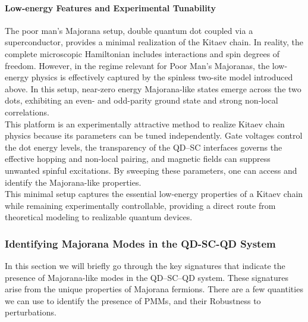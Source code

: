 \paragraph{Low-energy Features and Experimental Tunability}
The poor man's Majorana setup, double quantum dot coupled via a superconductor, provides a minimal realization of the Kitaev chain. In reality, the complete microscopic Hamiltonian includes interactions and spin degrees of freedom. However, in the regime relevant for Poor Man's Majoranas, the low-energy physics is effectively captured by the spinless two-site model introduced above. In this setup, near-zero energy Majorana-like states emerge across the two dots, exhibiting an even- and odd-parity ground state and strong non-local correlations.\\
This platform is an experimentally attractive method to realize Kitaev chain physics because its parameters can be tuned independently. Gate voltages control the dot energy levels, the transparency of the QD–SC interfaces governs the effective hopping and non-local pairing, and magnetic fields can suppress unwanted spinful excitations. By sweeping these parameters, one can access and identify the  Majorana-like properties. \\
This minimal setup captures the essential low-energy properties of a Kitaev chain while remaining experimentally controllable, providing a direct route from theoretical modeling to realizable quantum devices.

\subsubsection{Identifying Majorana Modes in the QD-SC-QD System}
In this section we will briefly go through the key signatures that indicate the presence of Majorana-like modes in the QD–SC–QD system. These signatures arise from the unique properties of Majorana fermions. There are a few quantities we can use to identify the presence of PMMs, and their Robustness to perturbations.\\

